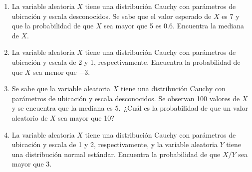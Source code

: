 \begin{Ejer}
\begin{enumerate}
\item La variable aleatoria $X$ tiene una distribuci\'on Cauchy con par\'ametros de ubicaci\'on y escala desconocidos. Se sabe que el valor esperado de $X$ es 7 y que la probabilidad de que $X$ sea mayor que 5 es 0.6. Encuentra la mediana de $X$.

\item La variable aleatoria $X$ tiene una distribuci\'on Cauchy con par\'ametros de ubicaci\'on y escala de 2 y 1, respectivamente. Encuentra la probabilidad de que $X$ sea menor que $-3$.

\item Se sabe que la variable aleatoria $X$ tiene una distribuci\'on Cauchy con par\'ametros de ubicaci\'on y escala desconocidos. Se observan 100 valores de $X$ y se encuentra que la mediana es 5. \,¿Cu\'al es la probabilidad de que un valor aleatorio de $X$ sea mayor que 10?

\item La variable aleatoria $X$ tiene una distribuci\'on Cauchy con par\'ametros de ubicaci\'on y escala de 1 y 2, respectivamente, y la variable aleatoria $Y$ tiene una distribuci\'on normal est\'andar. Encuentra la probabilidad de que $X/Y$ sea mayor que 3.

\end{enumerate}
\end{Ejer} 



